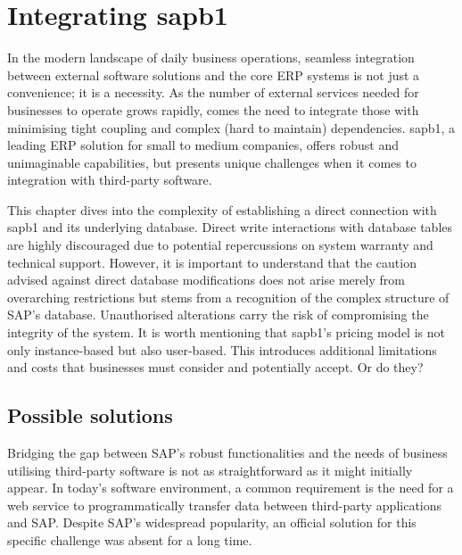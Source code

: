 \chapter{Integrating \gls{sapb1}}
\label{chap:integrating-sap-b1}

In the modern landscape of daily business operations, seamless integration between external software solutions and the core \ac{ERP} systems is not just a convenience; it is a necessity.
As the number of external services needed for businesses to operate grows rapidly, comes the need to integrate those with minimising tight coupling and complex (hard to maintain) dependencies.
\gls{sapb1}, a leading \ac{ERP} solution for small to medium companies, offers robust and unimaginable capabilities, but presents unique challenges when it comes to integration with third-party software. 

This chapter dives into the complexity of establishing a direct connection with \gls{sapb1} and its underlying database. 
Direct write interactions with database tables are highly discouraged due to potential repercussions on system warranty and technical support.
However, it is important to understand that the caution advised against direct database modifications does not arise merely from overarching restrictions but stems from a recognition of the complex structure of SAP's database. Unauthorised alterations carry the risk of compromising the integrity of the system.
It is worth mentioning that \gls{sapb1}'s pricing model is not only instance-based but also user-based.
This introduces additional limitations and costs that businesses must consider and potentially accept. 
Or do they?

\section{Possible solutions}
\label{sec:possible-solutions}

Bridging the gap between SAP's robust functionalities and the needs of business utilising third-party software is not as straightforward as it might initially appear. 
In today's software environment, a common requirement is the need for a web service to programmatically transfer data between third-party applications and SAP.
Despite SAP's widespread popularity, an official solution for this specific challenge was absent for a long time.

